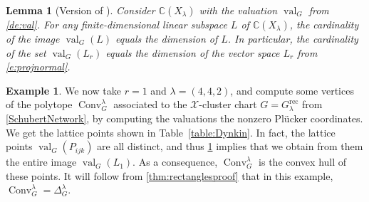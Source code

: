 \documentclass{amsart}
\newtheorem{lem}[thm]{Lemma}
\theoremstyle{definition}
\newtheorem{example}[thm]{Example}
\numberwithin{equation}{section}
\newcommand{\conv}{\operatorname{Conv}}
\newcommand{\rect}{\mathrm{rec}}
\newcommand{\C}{\mathbb{C}}
\newcommand{\val}{{\operatorname{val}}}
\begin{document}
\begin{lem}[Version of {\cite[Lemma from Section 2.2]{Ok96}}]
\label{l:okounkovlemma}
Consider $\C(X_{\lambda})$ with the valuation $\val_G$ from \cref{de:val}.  For  any finite-dimensional linear subspace $L$ of $\C(X_{\lambda})$,
 the cardinality of the image $\val_G(L)$ equals the dimension of $L$. In particular, the cardinality of the set $\val_G(L_r)$ equals
 the dimension of the vector space $L_r$ from \eqref{e:projnormal}.
\end{lem}


\begin{example}\label{ex:NO}
We now take $r=1$ and $\lambda=(4,4,2)$,
and compute some vertices of the polytope ${\conv}^{\lambda}_G$ 
associated to the $\mathcal{X}$-cluster
chart $G=G^{\rect}_{\lambda}$
from  \cref{SchubertNetwork}, by 
computing the valuations
the nonzero  Pl\"ucker coordinates.  We get the lattice points
shown in Table~\ref{table:Dynkin}. 
In fact, the lattice points $\val_G(P_{ijk})$ are all distinct, and thus \cref{l:okounkovlemma} implies that we obtain from them the entire image $\val_G(L_1)$. As a consequence, ${\conv}^{\lambda}_G$ is the convex hull of these points. 
It will follow from \cref{thm:rectanglesproof}
that in this example,
$\conv^{\lambda}_G = \Delta^{\lambda}_G$.
\end{example}
\end{document}
